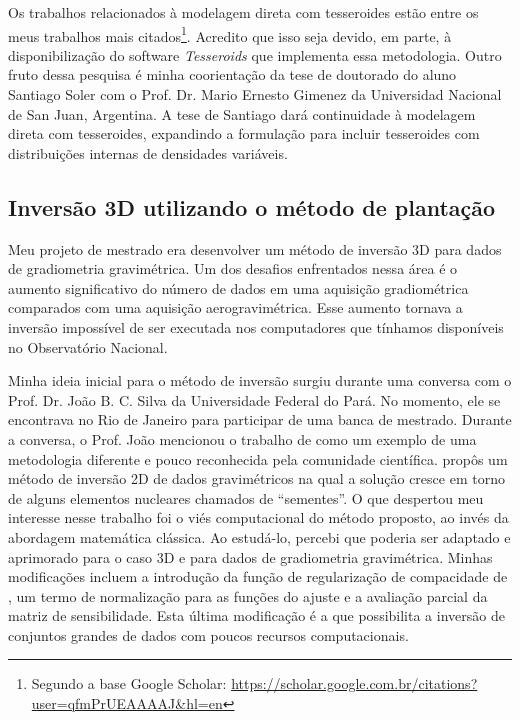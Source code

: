 \documentclass[12pt,a4paper,oneside,titlepage,onecolumn]{article}
\begin{document}
Os trabalhos relacionados à modelagem direta com tesseroides estão entre os
meus trabalhos mais citados\footnote{Segundo a base Google Scholar:
\url{https://scholar.google.com.br/citations?user=qfmPrUEAAAAJ&hl=en}}.
Acredito que isso seja devido, em parte, à disponibilização do software
\textit{Tesseroids} que implementa essa metodologia.
Outro fruto dessa pesquisa é minha coorientação da tese de doutorado do aluno
Santiago Soler com o Prof. Dr. Mario Ernesto Gimenez da Universidad Nacional de
San Juan, Argentina.
A tese de Santiago dará continuidade à modelagem direta com tesseroides,
expandindo a formulação para incluir tesseroides com distribuições internas de
densidades variáveis.


\subsection{Inversão 3D utilizando o método de plantação}

Meu projeto de mestrado era desenvolver um método de inversão 3D para dados de
gradiometria gravimétrica.
Um dos desafios enfrentados nessa área é o aumento significativo do número de
dados em uma aquisição gradiométrica comparados com uma aquisição
aerogravimétrica.
Esse aumento tornava a inversão impossível de ser executada nos computadores
que tínhamos disponíveis no Observatório Nacional.

Minha ideia inicial para o método de inversão surgiu durante uma conversa com o
Prof. Dr. João B. C. Silva da Universidade Federal do Pará.
No momento, ele se encontrava no Rio de Janeiro para participar de uma banca de
mestrado.
Durante a conversa, o Prof. João mencionou o trabalho de \citet{rene} como um
exemplo de uma metodologia diferente e pouco reconhecida pela comunidade
científica.
\citet{rene} propôs um método de inversão 2D de dados gravimétricos na qual a
solução cresce em torno de alguns elementos nucleares chamados de ``sementes''.
O que despertou meu interesse nesse trabalho foi o viés computacional do método
proposto, ao invés da abordagem matemática clássica.
Ao estudá-lo, percebi que poderia ser adaptado e aprimorado para o
caso 3D e para dados de gradiometria gravimétrica.
Minhas modificações incluem a introdução da função de regularização de
compacidade de \citet{silvadias2009},
um termo de normalização para as funções do ajuste
e a avaliação parcial da matriz de sensibilidade.
Esta última modificação é a que possibilita a inversão de conjuntos grandes de
dados com poucos recursos computacionais.
\end{document}
